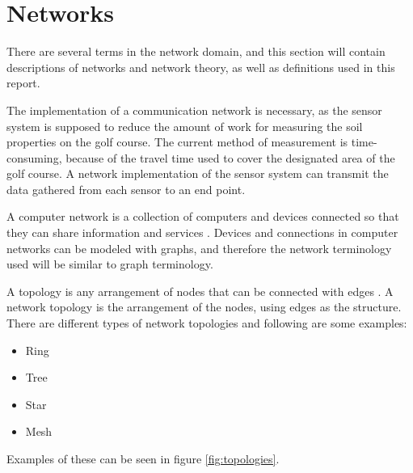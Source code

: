 \section{Networks}
There are several terms in the network domain, and this section will contain descriptions of networks and network theory, as well as definitions used in this report. 

The implementation of a communication network is necessary, as the sensor system is supposed to reduce the amount of work for measuring the soil properties on the golf course. The current method of measurement is time-consuming, because of the travel time used to cover the designated area of the golf course. A network implementation of the sensor system can transmit the data gathered from each sensor to an end point.

A computer network is a collection of computers and devices connected so that they can share information and services \cite{mansfield2009computer}. Devices and connections in computer networks can be modeled with graphs, and therefore the network terminology used will be similar to graph terminology. 



A topology is any arrangement of nodes that can be connected with edges \cite[p.~628]{discMath}. A network topology is the arrangement of the nodes, using edges as the structure. There are different types of network topologies and following are some examples:
\begin{itemize}
	\item Ring
	\item Tree
	\item Star
	\item Mesh
\end{itemize}

Examples of these can be seen in figure \ref{fig:topologies}.

